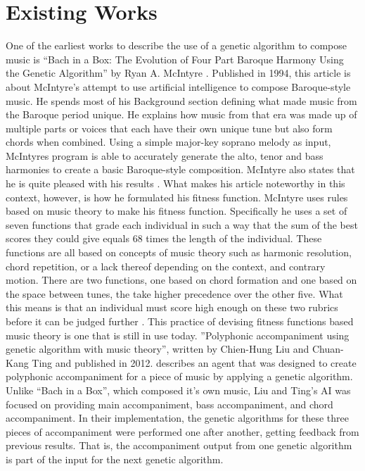 \documentclass[conference]{IEEEtran}
\begin{document}
\section{Existing Works}
One of the earliest works to describe the use of a genetic algorithm to compose music is “Bach in a Box: The Evolution of Four Part Baroque Harmony Using the Genetic Algorithm” by Ryan A. McIntyre \cite{b2}. Published in 1994, this article is about McIntyre’s attempt to use artificial intelligence to compose Baroque-style music. He spends most of his Background section defining what made music from the Baroque period unique. He explains how music from that era was made up of multiple parts or voices that each have their own unique tune but also form chords when combined. Using a simple major-key soprano melody as input, McIntyres program is able to accurately generate the alto, tenor and bass harmonies to create a basic Baroque-style composition. McIntyre also states that he is quite pleased with his results \cite{b2}. What makes his article noteworthy in this context, however, is how he formulated his fitness function.
McIntyre uses rules based on music theory to make his fitness function. Specifically he uses a set of seven functions that grade each individual in such a way that the sum of the best scores they could give equals 68 times the length of the individual. These functions are all based on concepts of music theory such as harmonic resolution, chord repetition, or a lack thereof depending on the context, and contrary motion. There are two functions, one based on chord formation and one based on the space between tunes, the take higher precedence over the other five. What this means is that an individual must score high enough on these two rubrics before it can be judged further \cite{b2}.  This practice of devising fitness functions based music theory is one that is still in use today.
”Polyphonic accompaniment using genetic algorithm with music theory”, written by Chien-Hung Liu and Chuan-Kang Ting and published in 2012. describes an agent that was designed to create polyphonic accompaniment for a piece of music by applying a genetic algorithm\cite{b1}.  Unlike “Bach in a Box”, which composed it’s own music, Liu and Ting’s AI was focused on providing main accompaniment, bass accompaniment, and chord accompaniment\cite{b1}. In their implementation, the genetic algorithms for these three pieces of accompaniment were performed one after another, getting feedback from previous results. That is, the accompaniment output from one genetic algorithm is part of the input for the next genetic algorithm.
\end{document}
